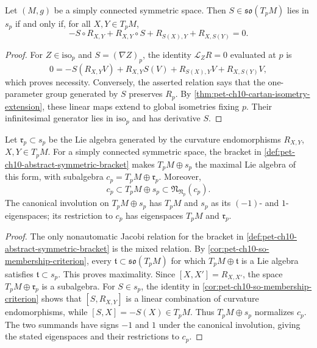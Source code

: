 \begin{corollary}
  \label{cor:pet-ch10-so-membership-criterion}

  Let $(M,g)$ be a simply connected symmetric space. Then $S\in\mathfrak{so}(T_pM)$
  lies in $s_p$ if and only if, for all $X,Y\in T_pM$,
  \[
    -S\circ R_{X,Y}+R_{X,Y}\circ S+R_{S(X),Y}+R_{X,S(Y)}=0.
  \]
\end{corollary}
\begin{proof}
  \sketch
  For $Z\in\mathrm{iso}_p$ and $S=(\nabla Z)_p$, the identity
  $\mathcal L_ZR=0$ evaluated at $p$ is
  \[
    0=-S(R_{X,Y}V)+R_{X,Y}S(V)+R_{S(X),Y}V+R_{X,S(Y)}V,
  \]
  which proves necessity. Conversely, the asserted relation says that the
  one-parameter group generated by $S$ preserves $R_p$. By
  \cref{thm:pet-ch10-cartan-isometry-extension}, these linear maps extend to
  global isometries fixing $p$. Their infinitesimal generator lies in
  $\mathrm{iso}_p$ and has derivative $S$.
\end{proof}

\begin{corollary}
  \label{cor:pet-ch10-maximal-subalgebra}

  Let $\mathfrak r_p\subset s_p$ be the Lie algebra generated by the curvature
  endomorphisms $R_{X,Y}$, $X,Y\in T_pM$. For a simply connected symmetric
  space, the bracket in
  \cref{def:pet-ch10-abstract-symmetric-bracket} makes $T_pM\oplus s_p$ the
  maximal Lie algebra of this form, with subalgebra
  $c_p=T_pM\oplus\mathfrak r_p$. Moreover,
  \[
    c_p\subset T_pM\oplus s_p
      \subset\mathfrak N_{\mathfrak N_p}(c_p).
  \]
  The canonical involution on $T_pM\oplus s_p$ has $T_pM$ and $s_p$ as its
  $(-1)$- and $1$-eigenspaces; its restriction to $c_p$ has eigenspaces
  $T_pM$ and $\mathfrak r_p$.
\end{corollary}
\begin{proof}
  \sketch
  The only nonautomatic Jacobi relation for the bracket in
  \cref{def:pet-ch10-abstract-symmetric-bracket} is the mixed relation. By
  \cref{cor:pet-ch10-so-membership-criterion}, every
  $\mathfrak t\subset\mathfrak{so}(T_pM)$ for which
  $T_pM\oplus\mathfrak t$ is a Lie algebra satisfies $\mathfrak t\subset s_p$.
  This proves maximality. Since $[X,X']=R_{X,X'}$, the space
  $T_pM\oplus\mathfrak r_p$ is a subalgebra. For $S\in s_p$, the identity in
  \cref{cor:pet-ch10-so-membership-criterion} shows that
  $[S,R_{X,Y}]$ is a linear combination of curvature endomorphisms, while
  $[S,X]=-S(X)\in T_pM$. Thus $T_pM\oplus s_p$ normalizes $c_p$. The two
  summands have signs $-1$ and $1$ under the canonical involution, giving the
  stated eigenspaces and their restrictions to $c_p$.
\end{proof}


